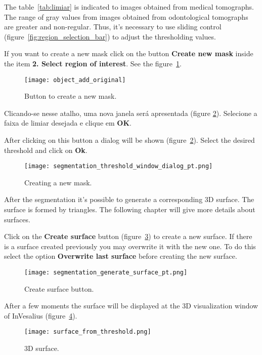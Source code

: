 The table~\ref{tab:limiar} is indicated to images obtained from medical tomographs. The range of gray values from images obtained from odontological tomographs are greater and non-regular. Thus, it's necessary to use sliding control (figure~\ref{fig:region_selection_bar}) to adjust the thresholding values.

If you want to create a new mask click on the button \textbf{Create new mask} inside the item  \textbf{2. Select region of interest}. See the figure~\ref{fig:shortcut_new_mask}.

\begin{figure}[!htb]
\centering
\texttt{[image: object\_add\_original]}
\caption{Button to create a new mask.}
\label{fig:shortcut_new_mask}
\end{figure}

Clicando-se nesse atalho, uma nova janela será apresentada (figure \ref{fig:create_new_mask}).  Selecione a faixa de limiar desejada e clique em \textbf{OK}.

After clicking on this button a dialog will be shown (figure~\ref{fig:create_new_mask}). Select the desired threshold and click on \textbf{Ok}.

\begin{figure}[!htb]
\centering
\texttt{[image: segmentation\_threshold\_window\_dialog\_pt.png]}
\caption{Creating a new mask.}
\label{fig:create_new_mask}
\end{figure}

\newpage

After the segmentation it's possible to generate a corresponding 3D surface. The surface is formed by triangles. The following chapter will give more details about surfaces.

Click on the \textbf{Create surface} button (figure~\ref{fig:generate_surface}) to create a new surface. If there is a surface created previously you may overwrite it with the new one. To do this select the option \textbf{Overwrite last surface} before creating the new surface.

\begin{figure}[!htb]
\centering
\texttt{[image: segmentation\_generate\_surface\_pt.png]}
\caption{Create surface button.}
\label{fig:generate_surface}
\end{figure}

After a few moments the surface will be displayed at the 3D visualization window of InVesalius (figure~\ref{fig:surface}).

\begin{figure}[!htb]
\centering
\texttt{[image: surface\_from\_threshold.png]}
\caption{3D surface.}
\label{fig:surface}
\end{figure}



